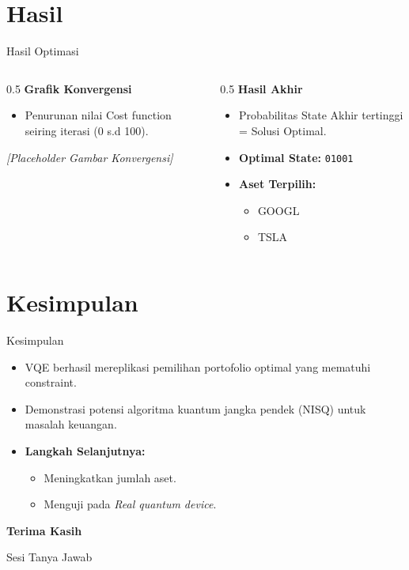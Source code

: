 \documentclass{beamer}
\begin{document}
\section{Hasil}
\begin{frame}{Hasil Optimasi}
    \begin{columns}
        \begin{column}{0.5\textwidth}
            \textbf{Grafik Konvergensi}
            \begin{itemize}
                	\item Penurunan nilai Cost function seiring iterasi (0 s.d 100).
            \end{itemize}
            \vspace{1cm}
            \textit{[Placeholder Gambar Konvergensi]}
        \end{column}
        \begin{column}{0.5\textwidth}
            \textbf{Hasil Akhir}
            \begin{itemize}
                	\item Probabilitas State Akhir tertinggi = Solusi Optimal.
                	\item \textbf{Optimal State:} \texttt{01001}
                	\item \textbf{Aset Terpilih:}
                \begin{itemize}
                    	\item GOOGL
                    	\item TSLA
                \end{itemize}
            \end{itemize}
        \end{column}
    \end{columns}
\end{frame}

\section{Kesimpulan}
\begin{frame}{Kesimpulan}
    \begin{itemize}
        	\item VQE berhasil mereplikasi pemilihan portofolio optimal yang mematuhi constraint.
        \item Demonstrasi potensi algoritma kuantum jangka pendek (NISQ) untuk masalah keuangan.
        \item \textbf{Langkah Selanjutnya:}
        \begin{itemize}
            	\item Meningkatkan jumlah aset.
            	\item Menguji pada \textit{Real quantum device}.
        \end{itemize}
    \end{itemize}
\end{frame}

\begin{frame}
    \centering
    \Huge \textbf{Terima Kasih}
    
    \vspace{1cm}
    \large Sesi Tanya Jawab
\end{frame}
\end{document}
